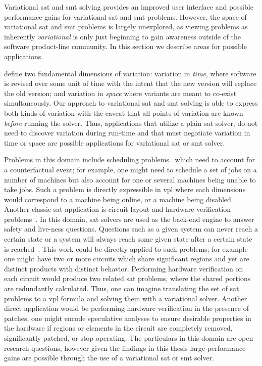\label{section:conclusion:applications}
%
Variational \ac{sat} and \ac{smt} solving provides an improved user interface
and possible performance gains for variational \ac{sat} and \ac{smt} problems.
However, the space of variational \ac{sat} and \ac{smt} problems is largely
unexplored, as viewing problems as inherently \emph{variational} is only just
beginning to gain awareness outside of the software product-line community. In
this section we describe areas for possible applications.

\citet{TTS+:VariVolution19} define two fundamental dimensions of variation:
variation in \emph{time}, where software is revised over some unit of time with
the intent that the new version will replace the old version; and variation in
\emph{space} where variants are meant to co-exist simultaneously. Our approach
to variational \ac{sat} and \ac{smt} solving is able to express both kinds of
variation with the caveat that all points of variation are known \emph{before}
running the solver. Thus, applications that utilize a plain \ac{sat} solver, do
not need to discover variation during run-time and that must negotiate variation
in time or space are possible applications for variational \ac{sat} or \ac{smt}
solver.

Problems in this domain include scheduling problems~\cite{BBH+09} which need to
account for a counterfactual event; for example, one might need to schedule a
set of jobs on a number of machines but also account for one or several machines
being unable to take jobs. Such a problem is directly expressible in \ac{vpl}
where each dimensions would correspond to a machine being online, or a machine
being disabled. Another classic \ac{sat} application is circuit layout and
hardware verification problems~\cite{BBH+09}. In this domain, \ac{sat} solvers
are used as the back-end engine to answer safety and live-ness questions.
Questions such as a given system can never reach a certain state or a system
will always reach some given state after a certain state is
reached~\cite{BBH+09}. This work could be directly applied to such problems; for
example one might have two or more circuits which share significant regions and
yet are distinct products with distinct behavior. Performing hardware
verification on each circuit would produce two related \ac{sat} problems, where
the shared portions are redundantly calculated. Thus, one can imagine
translating the set of \ac{sat} problems to a \ac{vpl} formula and solving them
with a variational solver. Another direct application would be performing
hardware verification in the presence of patches, one might encode speculative
analyses to ensure desirable properties in the hardware if regions or elements
in the circuit are completely removed, significantly patched, or stop operating.
The particulars in this domain are open research questions, however given the
findings in this thesis large performance gains are possible through the use of
a variational \ac{sat} or \ac{smt} solver.

